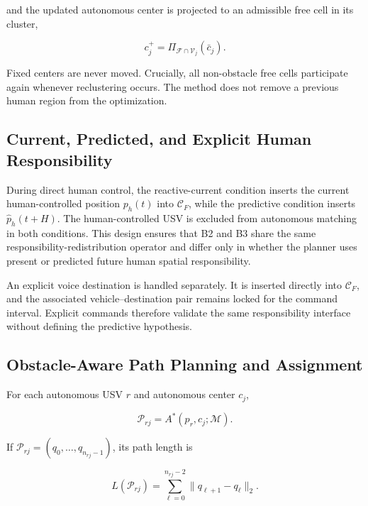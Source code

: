 \documentclass[conference]{IEEEtran}
\begin{document}
and the updated autonomous center is projected to an admissible free cell in
its cluster,

\begin{equation}
c_j^+=\Pi_{\mathcal{F}\cap\mathcal{V}_j}(\bar c_j).
\label{eq:center_projection}
\end{equation}

Fixed centers are never moved. Crucially, all non-obstacle free cells
participate again whenever reclustering occurs. The method does not remove a
previous human region from the optimization.

\subsection{Current, Predicted, and Explicit Human Responsibility}

During direct human control, the reactive-current condition inserts the current
human-controlled position $p_h(t)$ into $\mathcal{C}_F$, while the predictive
condition inserts $\hat p_h(t+H)$. The human-controlled USV is excluded from
autonomous matching in both conditions. This design ensures that B2 and B3
share the same responsibility-redistribution operator and differ only in
whether the planner uses present or predicted future human spatial
responsibility.

An explicit voice destination is handled separately. It is inserted directly
into $\mathcal{C}_F$, and the associated vehicle--destination pair remains
locked for the command interval. Explicit commands therefore validate the same
responsibility interface without defining the predictive hypothesis.

\subsection{Obstacle-Aware Path Planning and Assignment}

For each autonomous USV $r$ and autonomous center $c_j$,

\begin{equation}
\mathcal{P}_{rj}=A^*(p_r,c_j;\mathcal{M}).
\label{eq:astar_path}
\end{equation}

If $\mathcal{P}_{rj}=(q_0,\ldots,q_{n_{rj}-1})$, its path length is

\begin{equation}
L(\mathcal{P}_{rj})=
\sum_{\ell=0}^{n_{rj}-2}\|q_{\ell+1}-q_{\ell}\|_2.
\label{eq:path_length}
\end{equation}
\end{document}
